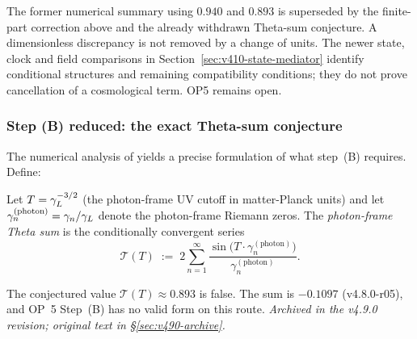 \begin{remark}
\label{rem:op5-structural-summary}
The former numerical summary using $0.940$ and $0.893$ is superseded
by the finite-part correction above and the already withdrawn
Theta-sum conjecture. A dimensionless discrepancy is not removed by a
change of units. The newer state, clock and field comparisons in
Section~\ref{sec:v410-state-mediator} identify conditional structures
and remaining compatibility conditions; they do not prove cancellation
of a cosmological term. OP5 remains open.
\end{remark}

\subsubsection*{Step (B) reduced: the exact Theta-sum conjecture}

The numerical analysis of  yields a precise formulation of
what step~(B) requires. Define:

\begin{definition}
\label{def:theta-sum-B}
Let $T = \gamma_L^{-3/2}$ (the photon-frame UV cutoff in matter-Planck units)
and let $\gamma_n^{(\mathrm{photon})} = \gamma_n/\gamma_L$ denote the
photon-frame Riemann zeros. The \emph{photon-frame Theta sum} is the
conditionally convergent series
\[
 \mathcal{T}(T)
 \;:=\;
 2\sum_{n=1}^\infty
 \frac{\sin\!\bigl(T\cdot\gamma_n^{(\mathrm{photon})}\bigr)}
 {\gamma_n^{(\mathrm{photon})}}.
\]
\end{definition}

\begin{proposition}\label{conj:theta-sum-B}
The conjectured value \(\mathcal T(T)\approx0.893\) is false.  The sum is \(-0.1097\) (v4.8.0-r05), and OP~5 Step~(B) has no valid form on this route.
\emph{Archived in the v4.9.0 revision; original text in \S\ref{sec:v490-archive}.}
\end{proposition}

